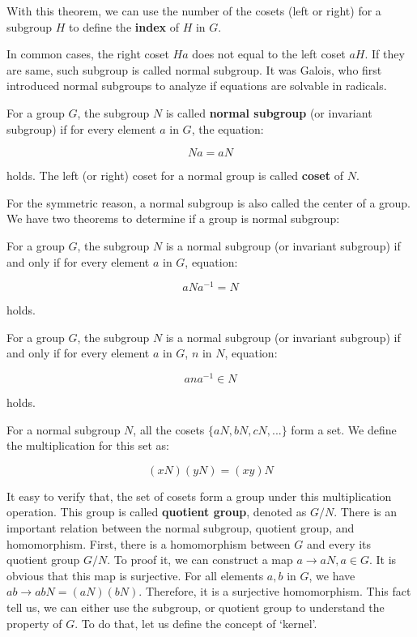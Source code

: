 \documentclass{article}
\begin{document}
With this theorem, we can use the number of the cosets (left or right) for a subgroup $H$ to define the \textbf{index} of $H$ in $G$.

In common cases, the right coset $Ha$ does not equal to the left coset $aH$. If they are same, such subgroup is called normal subgroup. It was Galois, who first introduced normal subgroups to analyze if equations are solvable in radicals.

 
\begin{definition}
For a group $G$, the subgroup $N$ is called \textbf{normal subgroup} (or invariant subgroup) if for every element $a$ in $G$, the equation:

\[
Na = aN
\]

holds. The left (or right) coset for a normal group is called \textbf{coset} of $N$.
\label{normal-subgroup}
\end{definition}

For the symmetric reason, a normal subgroup is also called the center of a group. We have two theorems to determine if a group is normal subgroup:

\begin{theorem}
For a group $G$, the subgroup $N$ is a normal subgroup (or invariant subgroup) if and only if for every element $a$ in $G$, equation:

\[
aNa^{-1} = N
\]

holds.
\end{theorem}

\begin{theorem}
For a group $G$, the subgroup $N$ is a normal subgroup (or invariant subgroup) if and only if for every element $a$ in $G$, $n$ in $N$, equation:

\[
ana^{-1} \in N
\]

holds.
\end{theorem}

For a normal subgroup $N$, all the cosets $\{aN, bN, cN, ...\}$ form a set. We define the multiplication for this set as:

\[
(xN)(yN) = (xy)N
\]

It easy to verify that, the set of cosets form a group under this multiplication operation. This group is called \textbf{quotient group}, denoted as $G/N$. There is an important relation between the normal subgroup, quotient group, and homomorphism. First, there is a homomorphism between $G$ and every its quotient group $G/N$. To proof it, we can construct a map $a \to aN, a \in G$. It is obvious that this map is surjective. For all elements $a, b$ in $G$, we have $ab \to abN = (aN)(bN)$. Therefore, it is a surjective homomorphism. This fact tell us, we can either use the subgroup, or quotient group to understand the property of $G$. To do that, let us define the concept of `kernel'.
\end{document}
